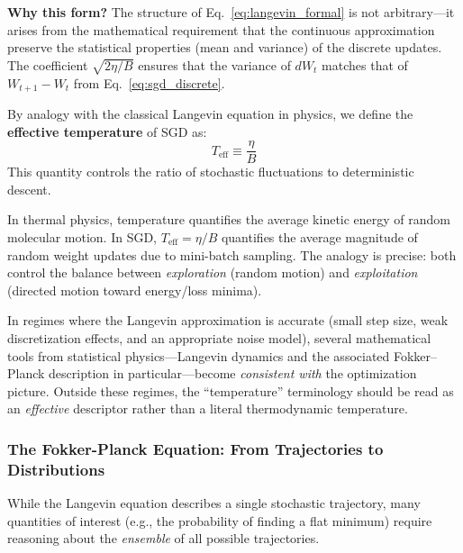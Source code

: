 \documentclass[
  journal=largetwo,
  year=2025,
  volume=37,
]{cup-journal}
\begin{document}
\textbf{Why this form?} The structure of Eq.~\eqref{eq:langevin_formal} is not arbitrary---it arises from the mathematical requirement that the continuous approximation preserve the statistical properties (mean and variance) of the discrete updates. The coefficient $\sqrt{2\eta/B}$ ensures that the variance of $dW_t$ matches that of $W_{t+1} - W_t$ from Eq.~\eqref{eq:sgd_discrete}.

\begin{definition}\label{def:effective_temp}
By analogy with the classical Langevin equation in physics, we define the \textbf{effective temperature} of SGD as:
\begin{equation}
    T_{\text{eff}} \equiv \frac{\eta}{B}
\end{equation}
This quantity controls the ratio of stochastic fluctuations to deterministic descent.
\end{definition}

\begin{remark}
In thermal physics, temperature quantifies the average kinetic energy of random molecular motion. In SGD, $T_{\text{eff}} = \eta/B$ quantifies the average magnitude of random weight updates due to mini-batch sampling. The analogy is precise: both control the balance between \textit{exploration} (random motion) and \textit{exploitation} (directed motion toward energy/loss minima).

In regimes where the Langevin approximation is accurate (small step size, weak discretization effects, and an appropriate noise model), several mathematical tools from statistical physics---Langevin dynamics and the associated Fokker--Planck description in particular---become \emph{consistent with} the optimization picture. Outside these regimes, the ``temperature'' terminology should be read as an \textit{effective} descriptor rather than a literal thermodynamic temperature.
\end{remark}

\subsubsection{The Fokker-Planck Equation: From Trajectories to Distributions}

While the Langevin equation describes a single stochastic trajectory, many quantities of interest (e.g., the probability of finding a flat minimum) require reasoning about the \textit{ensemble} of all possible trajectories.
\end{document}
